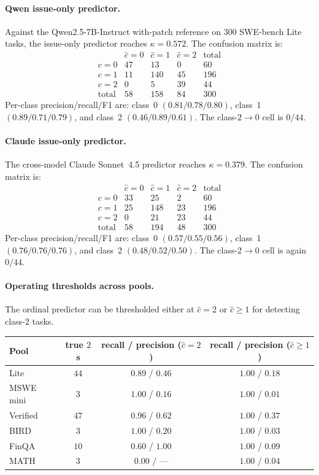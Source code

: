 \documentclass{article}
\begin{document}
\paragraph{Qwen issue-only predictor.}
Against the Qwen2.5-7B-Instruct with-patch reference on $300$
SWE-bench Lite tasks, the issue-only predictor reaches
$\kappa=0.572$. The confusion matrix is:
\[
\begin{array}{c|ccc|c}
& \hat{c}=0 & \hat{c}=1 & \hat{c}=2 & \text{total} \\\hline
c=0 & 47 & 13 & 0 & 60 \\
c=1 & 11 & 140 & 45 & 196 \\
c=2 & 0 & 5 & 39 & 44 \\\hline
\text{total} & 58 & 158 & 84 & 300
\end{array}
\]
Per-class precision/recall/F1 are: class~0
$(0.81/0.78/0.80)$, class~1 $(0.89/0.71/0.79)$, and class~2
$(0.46/0.89/0.61)$. The class-$2\to0$ cell is $0/44$.

\paragraph{Claude issue-only predictor.}
The cross-model Claude Sonnet~4.5 predictor reaches $\kappa=0.379$.
The confusion matrix is:
\[
\begin{array}{c|ccc|c}
& \hat{c}=0 & \hat{c}=1 & \hat{c}=2 & \text{total} \\\hline
c=0 & 33 & 25 & 2 & 60 \\
c=1 & 25 & 148 & 23 & 196 \\
c=2 & 0 & 21 & 23 & 44 \\\hline
\text{total} & 58 & 194 & 48 & 300
\end{array}
\]
Per-class precision/recall/F1 are: class~0
$(0.57/0.55/0.56)$, class~1 $(0.76/0.76/0.76)$, and class~2
$(0.48/0.52/0.50)$. The class-$2\to0$ cell is again $0/44$.

\paragraph{Operating thresholds across pools.}
The ordinal predictor can be thresholded either at $\hat{c}=2$ or
$\hat{c}\ge1$ for detecting class-$2$ tasks.

\begin{center}
\small
\begin{tabular}{lccc}
\toprule
Pool & true $2$s & recall / precision ($\hat{c}=2$) & recall / precision ($\hat{c}\ge1$) \\
\midrule
Lite      & $44$ & $0.89$ / $0.46$ & $1.00$ / $0.18$ \\
MSWE mini & $3$  & $1.00$ / $0.16$ & $1.00$ / $0.01$ \\
Verified  & $47$ & $0.96$ / $0.62$ & $1.00$ / $0.37$ \\
BIRD      & $3$  & $1.00$ / $0.20$ & $1.00$ / $0.03$ \\
FinQA     & $10$ & $0.60$ / $1.00$ & $1.00$ / $0.09$ \\
MATH      & $3$  & $0.00$ / ---    & $1.00$ / $0.04$ \\
\bottomrule
\end{tabular}
\end{center}
\end{document}
